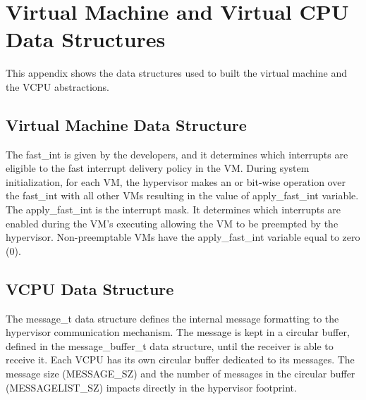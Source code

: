 \chapter{Virtual Machine and Virtual CPU Data Structures}
\label{appendix:a}

This appendix shows the data structures used to built the virtual machine and the VCPU abstractions. 

\section{Virtual Machine Data Structure}
\label{appendix:vm}

The fast\_int is given by the developers, and it determines which interrupts are eligible to the fast interrupt delivery policy in the VM. During system initialization, for each VM, the hypervisor makes an or bit-wise operation over the fast\_int with all other VMs resulting in the value of apply\_fast\_int variable. The apply\_fast\_int is the interrupt mask. It determines which interrupts are enabled during the VM's executing allowing the VM to be preempted by the hypervisor. Non-preemptable VMs have the apply\_fast\_int variable equal to zero (0).

\lstset{numbers=left, stepnumber=1, numbersep=5pt}



\section{VCPU Data Structure}
\label{appendix:vcpu}

The message\_t data structure defines the internal message formatting to the hypervisor communication mechanism. The message is kept in a circular buffer, defined in the message\_buffer\_t data structure, until the receiver is able to receive it. Each VCPU has its own circular buffer dedicated to its messages. The message size (MESSAGE\_SZ) and the number of messages in the circular buffer (MESSAGELIST\_SZ) impacts directly in the hypervisor footprint. 


